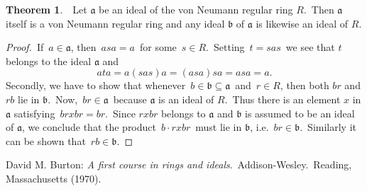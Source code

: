 \documentclass[12pt]{article}
\theoremstyle{definition}
\newtheorem*{thmplain}{Theorem}
\begin{document}
\begin{thmplain}
\,\, Let $\mathfrak{a}$ be an ideal of the von Neumann regular ring $R$. \,Then $\mathfrak{a}$ itself is a von Neumann regular ring and any ideal $\mathfrak{b}$ of $\mathfrak{a}$ is likewise an ideal of $R$.
\end{thmplain}

\begin{proof} \,If \,$a\in \mathfrak{a}$, then \,$asa = a$\, for some \,$s\in R$. \,Setting \,$t = sas$\, we see that $t$ belongs to the ideal $\mathfrak{a}$ and 
        $$ata = a(sas)a = (asa)sa = asa = a.$$
Secondly, we have to show that whenever \,$b\in\mathfrak{b} \subseteq \mathfrak{a}$\, and \,$r\in R$, then both $br$ and $rb$ lie in $\mathfrak{b}$. \,Now, \,$br\in \mathfrak{a}$\, because $\mathfrak{a}$ is an ideal of $R$. \,Thus there is an element $x$ in $\mathfrak{a}$ satisfying \,$brxbr = br$. \,Since $rxbr$ belongs to  $\mathfrak{a}$ and $\mathfrak{b}$ is assumed to be an ideal of $\mathfrak{a}$, we conclude that the product \,$b\cdot rxbr$\, must lie in $\mathfrak{b}$, i.e. \,$br\in\mathfrak{b}$. \,Similarly it can be shown that \,$rb\in\mathfrak{b}$.
\end{proof}

\begin{thebibliography}{9}
 David M. Burton: {\em A first course in rings and ideals}. \,Addison-Wesley. \,Reading, Massachusetts (1970).
\end{thebibliography}
\end{document}
